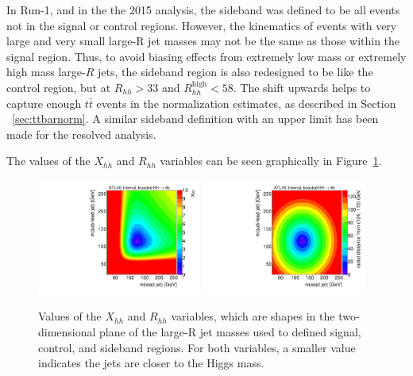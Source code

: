 In Run-1, and in the the 2015 analysis, the sideband was defined to be all events not in the signal or control regions. However, the kinematics of events with very large and very small large-R jet masses may not be the same as those within the signal region. Thus, to avoid biasing effects from extremely low mass or extremely high mass large-$R$ jets, the sideband region is also redesigned to be like the control region, but at $R_{hh} > 33$ and $R_{hh}^{\text{high}} < 58$. The shift upwards helps to capture enough $t\bar{t}$ events in the normalization estimates, as described in Section ~\ref{sec:ttbarnorm}. A similar sideband definition with an upper limit has been made for the resolved analysis.

The values of the $X_{hh}$ and $R_{hh}$ variables can be seen graphically in Figure~\ref{fig:boosted-regiondef-cartoons}.
\begin{figure}[htbp!]
\begin{center}
  \includegraphics[width=0.48\textwidth,angle=-90]{figures/boosted/Other/cartoon-xhh.pdf}
  \includegraphics[width=0.48\textwidth,angle=-90]{figures/boosted/Other/cartoon-rhh.pdf}
  \caption{Values of the $X_{hh}$ and $R_{hh}$ variables, which are shapes in the two-dimensional plane of the large-R jet masses used to defined signal, control, and sideband regions. For both variables, a smaller value indicates the jets are closer to the Higgs mass. }
  \label{fig:boosted-regiondef-cartoons}
\end{center}
\end{figure}

